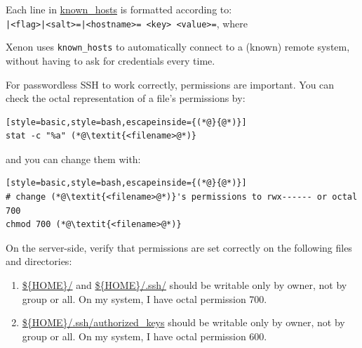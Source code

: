 \documentclass[12pt, a4paper, twoside, openany, titlepage]{book}
\begin{document}
Each line in  \url{known_hosts} is formatted according to: \\
\texttt{|<flag>|<salt>=|<hostname>= <key> <value>=}, where
Xenon uses \texttt{known\_hosts} to automatically connect to a (known)
remote system, without having to ask for credentials every time.

For passwordless SSH to work correctly, permissions are important. You can check the octal representation of a
file's permissions by:
\begin{lstlisting}[style=basic,style=bash,escapeinside={(*@}{@*)}]
stat -c "%a" (*@\textit{<filename>@*)}
\end{lstlisting}
and you can change them with:
\begin{lstlisting}[style=basic,style=bash,escapeinside={(*@}{@*)}]
# change (*@\textit{<filename>@*)}'s permissions to rwx------ or octal 700
chmod 700 (*@\textit{<filename>@*)}
\end{lstlisting}

On the server-side, verify that permissions are set correctly on the
following files and directories:
\begin{enumerate}
\item{\url{${HOME}/} and \url{${HOME}/.ssh/} should be writable only by
owner, not by group or all. On my system, I have octal permission 700. }
\item{\url{${HOME}/.ssh/authorized_keys} should be writable only by owner,
not by group or all. On my system, I have octal permission 600. } %
\end{enumerate}
\end{document}

